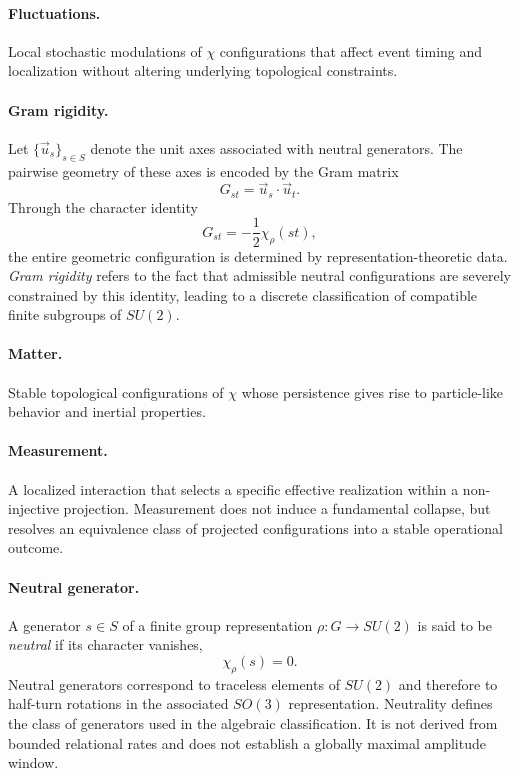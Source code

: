   \paragraph{Fluctuations.}
    Local stochastic modulations of $\chi$ configurations that affect event timing
    and localization without altering underlying topological constraints.

  \paragraph{Gram rigidity.}
    Let $\{\vec u_s\}_{s \in S}$ denote the unit axes associated with neutral generators.
    The pairwise geometry of these axes is encoded by the Gram matrix
    \[
      G_{st} = \vec u_s \cdot \vec u_t .
    \]
    Through the character identity
    \[
      G_{st} = -\frac{1}{2}\chi_\rho(st),
    \]
    the entire geometric configuration is determined by representation-theoretic data.
    \emph{Gram rigidity} refers to the fact that admissible neutral configurations are
    severely constrained by this identity, leading to a discrete classification of
    compatible finite subgroups of $SU(2)$.

  \paragraph{Matter.}
    Stable topological configurations of $\chi$ whose persistence gives rise to
    particle-like behavior and inertial properties.

  \paragraph{Measurement.}
    A localized interaction that selects a specific effective realization
    within a non-injective projection.
    Measurement does not induce a fundamental collapse, but resolves an
    equivalence class of projected configurations into a stable operational
    outcome.

  \paragraph{Neutral generator.}
    A generator $s \in S$ of a finite group representation $\rho : G \to SU(2)$ is said to be
    \emph{neutral} if its character vanishes,
    \[
      \chi_\rho(s) = 0.
    \]
    Neutral generators correspond to traceless elements of $SU(2)$ and therefore to
    half-turn rotations in the associated $SO(3)$ representation.
    Neutrality defines the class of generators used in the algebraic classification.
    It is not derived from bounded relational rates and does not establish a globally maximal amplitude window.

